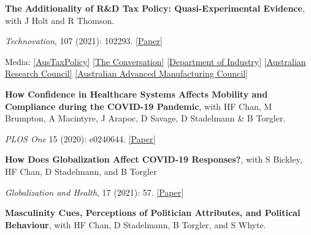 \documentclass[letterpaper]{article}
\renewenvironment{itemize}{
  \begin{list}{}{
    \setlength{\leftmargin}{1.5em}
  }
}{
  \end{list}
}
\begin{document}
\begin{itemize}
\item			\textbf{The Additionality of R\&D Tax Policy: Quasi-Experimental Evidence}, with J Holt and R Thomson.  
\vspace{-0.05in}
\item \textit{Technovation}, 107 (2021): 102293. \href{https://doi.org/10.1016/j.technovation.2021.102293}{[Paper]}			 
\begin{itemize}
	\item Media: \href{ https://www.austaxpolicy.com/the-additionality-of-rd-tax-policy-evidence-from-australia/}{[AusTaxPolicy]} \href{https://theconversation.com/randd-tax-incentives-need-to-be-simple-and-underpin-investor-confidence-66273}{[The Conversation]} \href{https://www.industry.gov.au/sites/g/files/net3906/f/May\%202018/document/extra/research-and-development-tax-incentive-review-report-cie_0.pdf}{[Department of Industry]} \href{https://dataportal.arc.gov.au/EI/API/impact-studies/681/pdf}{[Australian Research Council]} \href{http://www.aamc.org.au/rd-study-incentives-double-our-money/}{[Australian Advanced Manufacturing Council]}
\end{itemize}




\medskip

	
	\item \textbf{How Confidence in Healthcare Systems Affects Mobility and Compliance during the COVID-19 Pandemic}, with HF Chan, M Brumpton, A Macintyre, J Arapoc, D Savage, D Stadelmann \& B Torgler. 
	
	\vspace{-0.05in}
	
	
	\item \textit{PLOS One} 15 (2020): e0240644.  \href{https://psyarxiv.com/86qxu/}{[Paper]}
	
	\medskip
	
	\item \textbf{How Does Globalization Affect COVID-19 Responses?}, with S Bickley, HF Chan, D Stadelmann, and B Torgler 

\vspace{-0.05in}

\item \textit{Globalization and  Health}, 17 (2021): 57. \href{https://globalizationandhealth.biomedcentral.com/articles/10.1186/s12992-021-00677-5}{[Paper]}


	\medskip
	
	\item \textbf{Masculinity Cues, Perceptions of Politician Attributes, and Political Behaviour}, with HF Chan, D Stadelmann, B Torgler, and S Whyte. 
	

\end{itemize}
\end{document}

